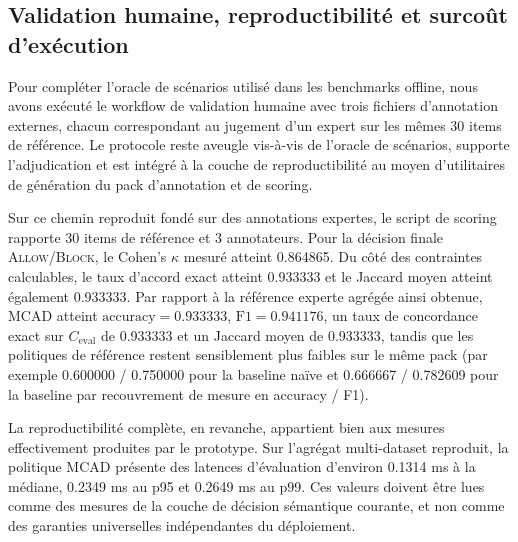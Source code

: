 \documentclass[journal]{IEEEtran}
\begin{document}
\subsection{Validation humaine, reproductibilité et surcoût d'exécution}

Pour compléter l'oracle de scénarios utilisé dans les benchmarks offline, nous avons exécuté le workflow de validation humaine avec trois fichiers d'annotation externes, chacun correspondant au jugement d'un expert sur les mêmes 30 items de référence. Le protocole reste aveugle vis-à-vis de l'oracle de scénarios, supporte l'adjudication et est intégré à la couche de reproductibilité au moyen d'utilitaires de génération du pack d'annotation et de scoring.

Sur ce chemin reproduit fondé sur des annotations expertes, le script de scoring rapporte 30 items de référence et 3 annotateurs. Pour la décision finale \textsc{Allow}/\textsc{Block}, le Cohen's $\kappa$ mesuré atteint 0.864865. Du côté des contraintes calculables, le taux d'accord exact atteint 0.933333 et le Jaccard moyen atteint également 0.933333. Par rapport à la référence experte agrégée ainsi obtenue, MCAD atteint $\mathrm{accuracy}=0.933333$, $\mathrm{F1}=0.941176$, un taux de concordance exact sur $C_{\mathrm{eval}}$ de 0.933333 et un Jaccard moyen de 0.933333, tandis que les politiques de référence restent sensiblement plus faibles sur le même pack (par exemple 0.600000 / 0.750000 pour la baseline naïve et 0.666667 / 0.782609 pour la baseline par recouvrement de mesure en accuracy / F1).

La reproductibilité complète, en revanche, appartient bien aux mesures effectivement produites par le prototype. Sur l'agrégat multi-dataset reproduit, la politique MCAD présente des latences d'évaluation d'environ 0.1314 ms à la médiane, 0.2349 ms au p95 et 0.2649 ms au p99. Ces valeurs doivent être lues comme des mesures de la couche de décision sémantique courante, et non comme des garanties universelles indépendantes du déploiement.
\end{document}
